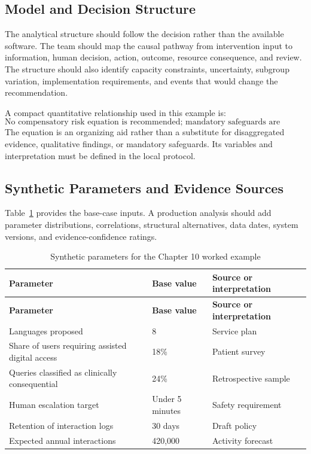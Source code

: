 \subsection{Model and Decision Structure}
The analytical structure should follow the decision rather than the available
software. The team should map the causal pathway from intervention input to
information, human decision, action, outcome, resource consequence, and review.
The structure should also identify capacity constraints, uncertainty, subgroup
variation, implementation requirements, and events that would change the
recommendation.

A compact quantitative relationship used in this example is:
\begin{equation}
\text{No compensatory risk equation is recommended; mandatory safeguards are assessed as gates.}
\label{eq:comp-ch10-key-relationship}
\end{equation}
The equation is an organizing aid rather than a substitute for disaggregated evidence,
qualitative findings, or mandatory safeguards. Its variables and interpretation must
be defined in the local protocol.

\subsection{Synthetic Parameters and Evidence Sources}
Table~\ref{tab:comp-ch10-parameters} provides the base-case inputs. A
production analysis should add parameter distributions, correlations, structural
alternatives, data dates, system versions, and evidence-confidence ratings.

\begin{longtable}{@{}p{}p{}p{}@{}}
\caption{Synthetic parameters for the Chapter 10 worked example}
\label{tab:comp-ch10-parameters}\\
\toprule
\textbf{Parameter} & \textbf{Base value} & \textbf{Source or interpretation} \\
\midrule
\endfirsthead
\toprule
\textbf{Parameter} & \textbf{Base value} & \textbf{Source or interpretation} \\
\midrule
\endhead
\bottomrule
\endlastfoot
Languages proposed & 8 & Service plan \\
Share of users requiring assisted digital access & 18\% & Patient survey \\
Queries classified as clinically consequential & 24\% & Retrospective sample \\
Human escalation target & Under 5 minutes & Safety requirement \\
Retention of interaction logs & 30 days & Draft policy \\
Expected annual interactions & 420,000 & Activity forecast \\
\end{longtable}

